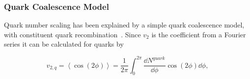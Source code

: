 



%


\subsubsection{Quark Coalescence Model}

Quark number scaling has been explained by a simple quark coalescence model, with constituent quark recombination~\cite{Molnar:2003ff}. Since $v_2$ is the coefficient from a Fourier series it can be calculated for quarks by

\begin{equation}
v_{2,q}=\left<\cos \left(2 \phi\right) \right>=\frac{1}{2\pi}\int_0^{2\pi}\frac{\dd {N^{quark}}}{\dd \phi}\cos\left(2\phi \right)\dd \phi,
\end{equation} 

